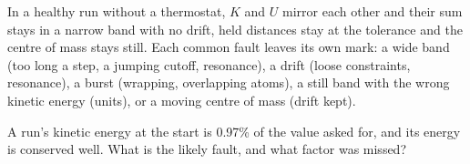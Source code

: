 \begin{keyidea}
In a healthy run without a thermostat, $K$ and $U$ mirror each other and
their sum stays in a narrow band with no drift, held distances stay at
the tolerance and the centre of mass stays still. Each common fault leaves
its own mark: a wide band (too long a step, a jumping cutoff, resonance),
a drift (loose constraints, resonance), a burst (wrapping, overlapping
atoms), a still band with the wrong kinetic energy (units), or a moving
centre of mass (drift kept).
\end{keyidea}


\begin{selfcheck}
A run's kinetic energy at the start is 0.97\% of the value asked for, and
its energy is conserved well. What is the likely fault, and what factor
was missed?
\end{selfcheck}
